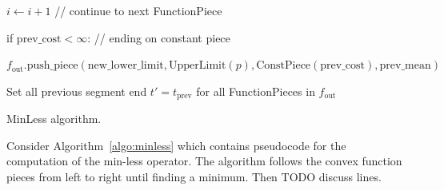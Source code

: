 \documentclass{article}
\begin{document}
\begin{algorithm}[H]
\begin{algorithmic}[1]
\begin{ALC@g}
\begin{ALC@g}
\begin{ALC@g}
      \STATE $i\gets i+1$ // continue to next FunctionPiece
    \end{ALC@g}
  \end{ALC@g}
\end{ALC@g}
  \STATE if $\text{prev\_cost} < \infty$: // ending on constant piece
  \begin{ALC@g}
    \STATE $f_{\text{out}}\text{.push\_piece}(
    \text{new\_lower\_limit}, 
    \text{UpperLimit}(p), 
    \text{ConstPiece}(\text{prev\_cost}), 
    \text{prev\_mean})$
  \end{ALC@g}
\STATE Set all previous segment end $t'=t_{\text{prev}}$  for all FunctionPieces in $f_{\text{out}}$
\caption{\label{algo:minless}MinLess algorithm.}
\end{algorithmic}
\end{algorithm}

Consider Algorithm~\ref{algo:minless} which contains pseudocode for
the computation of the min-less operator. The algorithm follows the
convex function pieces from left to right until finding a
minimum. Then TODO discuss lines.
\end{document}
